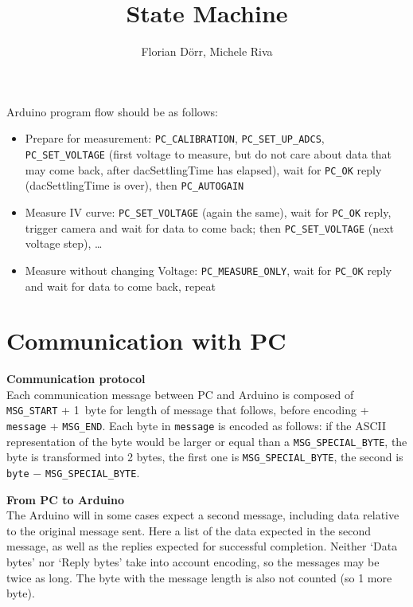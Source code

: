\documentclass[11pt,a4paper,english]{article}
\author{Florian D\"orr, Michele Riva}
\title{State Machine}
\begin{document}
\titlepage

Arduino program flow should be as follows:
\begin{itemize}
\item Prepare for measurement: \texttt{PC\_CALIBRATION}, \texttt{PC\_SET\_UP\_ADCS}, \texttt{PC\_SET\_VOLTAGE} (first voltage to measure, but do not care about data that may come back, after dacSettlingTime has elapsed), wait for \texttt{PC\_OK} reply (dacSettlingTime is over), then \texttt{PC\_AUTOGAIN}
\item Measure IV curve: \texttt{PC\_SET\_VOLTAGE} (again the same), wait for \texttt{PC\_OK} reply, trigger camera and wait for data to come back; then \texttt{PC\_SET\_VOLTAGE} (next voltage step), \ldots
\item Measure without changing Voltage: \texttt{PC\_MEASURE\_ONLY}, wait for \texttt{PC\_OK} reply and wait for data to come back, repeat
\end{itemize}

\section{Communication with PC}
\textbf{Communication protocol}\\Each communication message between PC and Arduino is composed of \texttt{MSG\_START} + 1~byte for length of message that follows, before encoding + \texttt{message} + \texttt{MSG\_END}. Each byte in \texttt{message} is encoded as follows: if the ASCII representation of the byte would be larger or equal than a \texttt{MSG\_SPECIAL\_BYTE}, the byte is transformed into 2 bytes, the first one is \texttt{MSG\_SPECIAL\_BYTE}, the second is \texttt{byte} $-$ \texttt{MSG\_SPECIAL\_BYTE}.

\vspace*{\baselineskip}
\noindent\textbf{From PC to Arduino}\\The Arduino will in some cases expect a second message, including data relative to the original message sent. Here a list of the data expected in the second message, as well as the replies expected for successful completion. Neither `Data bytes' nor `Reply bytes' take into account encoding, so the messages may be twice as long. The byte with the message length is also not counted (so 1 more byte).
\end{document}
